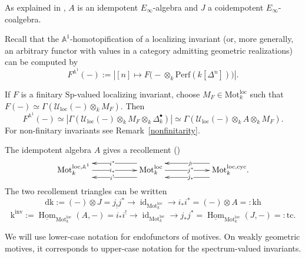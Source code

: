 \documentclass{amsart}
\theoremstyle{plain}
\theoremstyle{definition}
\newcommand{\bbA}{\mathbb{A}}
\newcommand{\Perf}{\mathrm{Perf}}
\newcommand{\Motloc}{\mathrm{Mot}^{\mathrm{loc}}}
\newcommand{\MotlocA}{\mathrm{Mot}^{\mathrm{loc},\mathbb A^1}}
\newcommand{\Motloccyc}{\mathrm{Mot}^{\mathrm{loc},\mathrm{cyc}}}
\newcommand{\Uloc}{\mathcal U_{\mathrm{loc}}}
\newcommand{\dk}{\mathrm{dk}}
\newcommand{\kh}{\mathrm{kh}}
\newcommand{\tc}{\mathrm{tc}}
\newcommand{\kinv}{\mathrm{k}^{\mathrm{inv}}}
\newcommand{\Sp}{\mathrm{Sp}}
\DeclareMathOperator{\Hom}{Hom}
\DeclareMathOperator{\id}{id}
\begin{document}
As explained in \cite[Sections 1.3 and 8]{Efi25b}, $A$ is an idempotent $E_\infty$-algebra and $J$ a coidempotent $E_\infty$-coalgebra.

\medskip

Recall that the $\bbA^1$-homotopification of a localizing invariant
(or, more generally, an arbitrary functor with values in a category admitting geometric realizations) can be computed by
\begin{equation}\label{A1ization}
F^{\bbA^1}(-)
:=|[n]\longmapsto
F\bigl(-\otimes_k\Perf(k[\Delta^n])\bigr)|.
\end{equation}

If $F$ is a finitary $\Sp$-valued localizing invariant, choose
$M_F\in\Motloc_k$ such that
$F(-)\simeq\Gamma(\Uloc(-)\otimes_kM_F)$. Then
\begin{equation}\label{finitaryA1ization}
F^{\bbA^1}(-)\simeq
|\Gamma(\Uloc(-)\otimes_kM_F\otimes_k\Delta_k^\bullet)|
\simeq\Gamma(\Uloc(-)\otimes_kA\otimes_kM_F).
\end{equation}
For non-finitary invariants see Remark~\ref{nonfinitarity}.



The idempotent algebra $A$ gives a recollement
(\cite[Section 1.3 and Remark 9.6]{Efi25b})
\begin{equation}\label{recollement}
\xymatrix{
\MotlocA_k \ar[rr]|{i_*} &&
\Motloc_k
 \ar@<-2ex>[ll]|{i^*}
 \ar@<2ex>[ll]|{i^!}
 \ar[rr]|{j^*} &&
\Motloccyc_k
 \ar@<-2ex>[ll]|{j_!}
 \ar@<2ex>[ll]|{j_*}.}
\end{equation}
The two recollement triangles can be written
\begin{equation}\label{recol1}
\dk:=(-)\otimes J =j_!j^*
\longrightarrow
\id_{\Motloc_k}
\longrightarrow
i_*i^* = (-)\otimes A =:\kh
\end{equation}
\begin{equation}\label{recol2}
\kinv:=\underline{\Hom}_{\Motloc_k}(A, -) = i_*i^!
\longrightarrow
\id_{\Motloc_k}
\longrightarrow
j_*j^* = \underline{\Hom}_{\Motloc_k}(J, -)=:\tc.
\end{equation}

We will use lower-case notation for endofunctors of motives. On weakly geometric motives, it corresponds to upper-case notation for the spectrum-valued invariants.


\medskip
\end{document}

